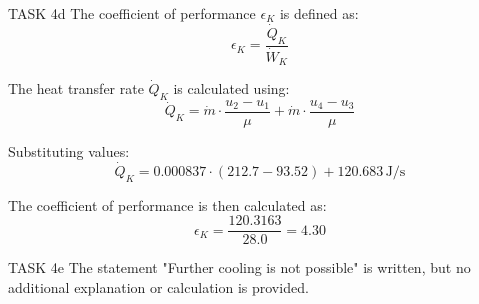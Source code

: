 TASK 4d  
The coefficient of performance \( \epsilon_K \) is defined as:  
\[
\epsilon_K = \frac{\dot{Q}_K}{\dot{W}_K}
\]

The heat transfer rate \( \dot{Q}_K \) is calculated using:  
\[
\dot{Q}_K = \dot{m} \cdot \frac{u_2 - u_1}{\mu} + \dot{m} \cdot \frac{u_4 - u_3}{\mu}
\]

Substituting values:  
\[
\dot{Q}_K = 0.000837 \cdot \left( 212.7 - 93.52 \right) + 120.683 \, \text{J/s}
\]

The coefficient of performance is then calculated as:  
\[
\epsilon_K = \frac{120.3163}{28.0} = 4.30
\]

TASK 4e  
The statement "Further cooling is not possible" is written, but no additional explanation or calculation is provided.